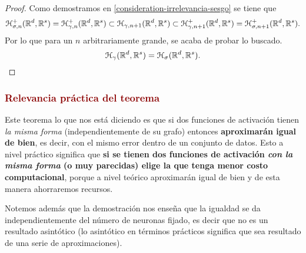 \begin{aportacionOriginal}
\begin{proof}
    Como demostramos en \ref{consideration-irrelevancia-sesgo} se tiene que 
    \begin{equation*}
        \mathcal{H}^+_{\sigma, n}(\mathbb{R}^d, \mathbb{R}^s) = \mathcal{H}^+_{\gamma, n}(\mathbb{R}^d, \mathbb{R}^s) 
        \subset 
            \mathcal{H}_{\gamma, n+1}(\mathbb{R}^d, \mathbb{R}^s) 
        \subset
        \mathcal{H}^+_{\gamma, {n+1}}(\mathbb{R}^d, \mathbb{R}^s) = \mathcal{H}^+_{\sigma, {n+1}}(\mathbb{R}^d, \mathbb{R}^s) 
        .
    \end{equation*}
    Por lo que para un $n$ arbitrariamente grande, se acaba de probar lo buscado. 
    \begin{equation*}
        \mathcal{H}_{\gamma}(\mathbb{R}^d, \mathbb{R}^s) = \mathcal{H}_{\sigma}(\mathbb{R}^d, \mathbb{R}^s).
    \end{equation*}
\end{proof}
\end{aportacionOriginal}



\subsubsection*{\iconoClave  \textcolor{darkRed}{Relevancia práctica del teorema}}
Este teorema lo que nos está diciendo es que si dos funciones de activación tienen \textit{la misma forma}
(independientemente de su grafo)
entonces \textbf{aproximarán igual de bien},
es decir, con el mismo error dentro de un conjunto de datos.
 Esto a nivel práctico  significa que \textbf{si se tienen dos funciones de activación
  \textit{con la misma forma} (o muy parecidas) elige
   la que tenga menor costo computacional}, porque a 
   nivel teórico aproximarán igual de bien y de esta
    manera ahorraremos recursos. 

Notemos además que la demostración nos enseña que la igualdad se da independientemente del número de 
neuronas fijado, es decir que no es un resultado 
asintótico (lo asintótico en términos prácticos 
significa que sea resultado de una serie de 
aproximaciones).  

